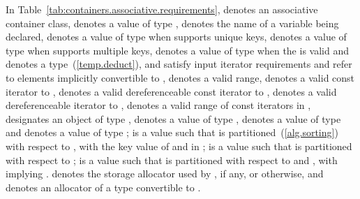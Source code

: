 \pnum
In Table~\ref{tab:containers.associative.requirements},
 denotes an associative container class,
 denotes a value of type ,
 denotes the name of a variable being declared,
 denotes a value of type 
when  supports unique keys,
 denotes a value of type 
when  supports multiple keys,
 denotes a value of type  when the 
 is valid
and denotes a type~(\ref{temp.deduct}),
 and 
satisfy input iterator requirements and refer to elements
implicitly convertible to
, 
denotes a valid range,
 denotes a valid const iterator to ,
 denotes a valid dereferenceable const iterator to ,
 denotes a valid dereferenceable iterator to ,
\tcode{[q1, q2)} denotes a valid range of const iterators in ,
 designates an object of type ,
 denotes a value of type ,
 denotes a value of type 
and  denotes a value of type ;
 is a value such that  is partitioned~(\ref{alg.sorting})
with respect to , with  the key value of 
and  in ;
 is a value such that  is partitioned with respect to
;
 is a value such that  is partitioned with respect to
 and , with  implying
.
 denotes the storage allocator used by , if any, or  otherwise, and  denotes an allocator of a type convertible to .

